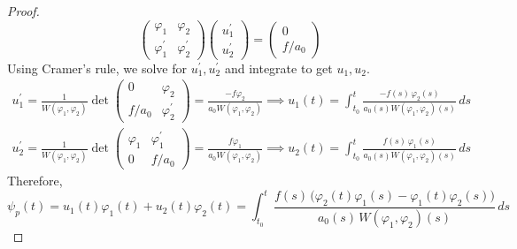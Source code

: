 \documentclass{article}
\theoremstyle{remark}
\theoremstyle{definition}
\begin{document}
\begin{proof}
\[\begin{pmatrix}
\varphi_1 & \varphi_2 \\
\varphi_1^\prime & \varphi_2^\prime
\end{pmatrix} \begin{pmatrix}
u_1^\prime \\u_2^\prime
\end{pmatrix} = \begin{pmatrix}
0 \\ f / a_0
\end{pmatrix}\]
Using Cramer's rule, we solve for $u_1^\prime, u_2^\prime$ and integrate to get $u_1, u_2$. 
\begin{align*}
    u_1^\prime = \frac{1}{W(\varphi_1, \varphi_2)} \det{\begin{pmatrix} 0 & \varphi_2 \\ f / a_0 & \varphi_2^\prime
    \end{pmatrix}} = \frac{-f \varphi_2}{a_0 W(\varphi_1, \varphi_2)} \implies u_1 (t) = \int_{t_0}^t \frac{-f(s)\,\varphi_2 (s)}{ a_0 (s) W(\varphi_1, \varphi_2) (s)}\,ds \\
    u_2^\prime = \frac{1}{W(\varphi_1, \varphi_2)} \det{\begin{pmatrix} \varphi_1 & \varphi_1^\prime \\ 0 & f / a_0
    \end{pmatrix}} = \frac{f \varphi_1}{a_0 W(\varphi_1, \varphi_2)} \implies u_2 (t) = \int_{t_0}^t \frac{f(s)\,\varphi_1 (s)}{ a_0 (s) W(\varphi_1, \varphi_2) (s)}\,ds
\end{align*}
Therefore, 
\[\psi_p (t) = u_1 (t) \varphi_1 (t) + u_2 (t) \varphi_2 (t) = \int_{t_0}^t \frac{f(s) \, \big( \varphi_2 (t) \varphi_1 (s) - \varphi_1(t) \varphi_2 (s)\big)}{a_0 (s) \, W(\varphi_1, \varphi_2) (s)}\,ds\]
\end{proof}
\end{document}
